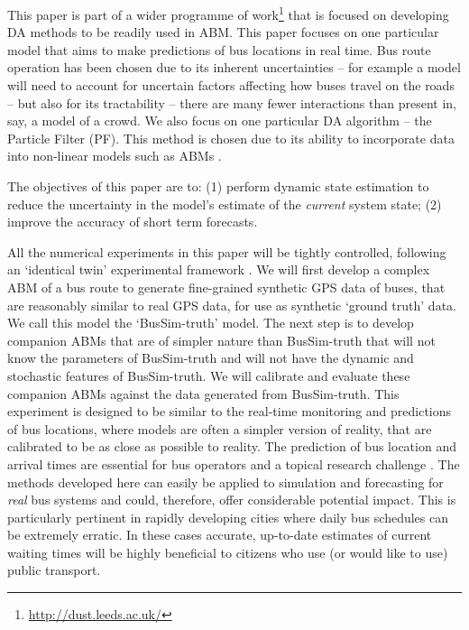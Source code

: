 \documentclass{article}
\begin{document}
This paper is part of a wider programme of work\footnote{\url{http://dust.leeds.ac.uk/}} that is focused on developing DA methods to be readily used in ABM. This paper focuses on one particular model that aims  to make predictions of bus locations in real time. Bus route operation has been chosen due to its inherent uncertainties -- for example a model will need to account for uncertain factors affecting how buses travel on the roads \citep{khosravi2011prediction} -- but also for its tractability -- there are many fewer interactions than present in, say, a model of a crowd.  We also focus on one particular DA algorithm -- the Particle Filter (PF). This method is chosen due to its ability to incorporate data into non-linear models such as ABMs \citep{carpenter1999improved}.

The objectives of this paper are to: (1) perform dynamic state estimation to reduce the
uncertainty in the model's estimate of the \textit{current} system state; (2) improve the accuracy of short term forecasts.

All the numerical experiments in this paper will be tightly controlled, following an `identical twin' experimental framework \citep[for example see][]{wang_data_2015}. We will first develop a complex ABM of a bus route to generate fine-grained synthetic GPS data of buses, that are reasonably similar to real GPS data, for use as synthetic `ground truth' data. We call this model the `BusSim-truth' model. The next step
is to develop companion ABMs that are of simpler nature than BusSim-truth that will not know the parameters of BusSim-truth and will not have the dynamic and stochastic features of BusSim-truth. We will calibrate and evaluate these companion ABMs against the data generated from BusSim-truth. This experiment is designed to be similar to the real-time monitoring and predictions of bus locations, where models are often a simpler version of reality, that are calibrated to be as close as possible to reality. The prediction of bus location and arrival times are essential for bus operators and a topical research challenge \citep{bin2006bus}. The methods developed here can easily be applied to simulation and forecasting for \textit{real} bus systems and could, therefore, offer considerable potential impact. This is particularly pertinent in rapidly developing cities where daily bus schedules can be extremely erratic. In these cases accurate, up-to-date estimates of current waiting times will be highly beneficial to citizens who use (or would like to use) public transport. 
\end{document}
